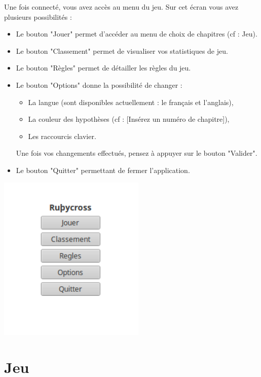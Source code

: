 \documentclass[a4paper, 12pt]{report}
\begin{document}
	    Une fois connecté, vous avez accès au menu du jeu. Sur cet écran vous avez plusieurs possibilités :
	    \begin{itemize}
            \item Le bouton "Jouer" permet d'accéder au menu de choix de chapitres (cf : Jeu).
            \item Le bouton "Classement" permet de visualiser vos statistiques de jeu.
            \item Le bouton "Règles" permet de détailler les règles du jeu.
            \item Le bouton "Options" donne la possibilité de changer :
            \begin{itemize}
                \item La langue (sont disponibles actuellement : le français et l'anglais),
                \item La couleur des hypothèses (cf : [Insérez un numéro de chapitre]),
                \item Les raccourcis clavier.
            \end{itemize}
            Une fois vos changements effectués, pensez à appuyer sur le bouton "Valider".
            \item Le bouton "Quitter" permettant de fermer l'application.
        \end{itemize}

        \begin{minipage}{\linewidth}
                    \centering
			        \includegraphics[width=7cm]{screenMenuJeu.png}
	    \end{minipage}


	\section{Jeu}
\end{document}
